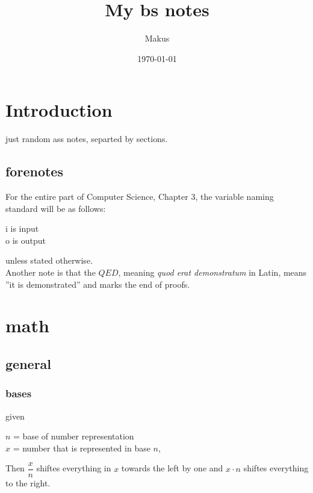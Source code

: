 \documentclass{article} %
\title{My bs notes}
\author{Makus}
\date{\today}
\theoremstyle{theorem}
\theoremstyle{definition}
\begin{document}
\maketitle

\tableofcontents
\pagebreak
\section{Introduction}
    \begin{center}
        just random ass notes, separted by sections.
    \end{center}
    \subsection{forenotes}
    For the entire part of Computer Science, Chapter 3, the variable naming standard will be as follows:
    \begin{center}
        i is input\\ o is output
    \end{center}
    unless stated otherwise.
    \\Another note is that the $QED$, meaning \textit{quod erat demonstratum} in Latin, means ''it is demonstrated'' and marks the end of proofs.
\pagebreak
\section{math}%
    \subsection{general}
        \subsubsection{bases}
        given  \begin{center}
            $n$ = base of number representation\\
            $x$ = number that is represented in base $n$,
        \end{center}
        Then $\dfrac{x}{n}$ shiftes everything in $x$ towards the left by one and $x\cdot n$ shiftes everything to the right.
\end{document}
